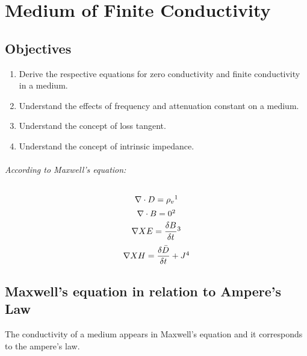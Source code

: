\chapter{Medium of Finite Conductivity}\label{lec:lec25}


\begin{mdframed}[backgroundcolor=lightblue, linewidth=1pt,  hidealllines=true]
\section{Objectives}
\begin{enumerate}
			\item Derive the respective equations for zero conductivity and finite conductivity in a medium.
			\item Understand the effects of frequency and attenuation constant on a medium.
			\item Understand the concept of loss tangent.
			\item Understand the concept of intrinsic impedance.
		\end{enumerate}
	\end{mdframed}
	



\subparagraph{According to Maxwell's equation:}

	\begin{equation}
	\nabla\cdot D = \rho_{v}\footnotemark
	\end{equation}
\begin{equation}	 
\nabla\cdot B = 0\footnotemark
\end{equation}
\begin{equation}
\nabla X E = \frac{\delta B}{\delta t}\footnotemark
\end{equation}
\begin{equation}
\nabla XH =\frac{\delta \bar{D}}{\delta t} + J\footnotemark
\end{equation}
\section{Maxwell's equation in relation to Ampere's Law}
The conductivity of a medium appears in Maxwell's equation and it corresponds to the ampere's law.

